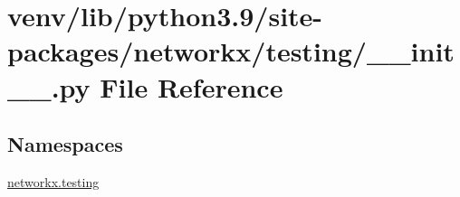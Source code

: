\hypertarget{venv_2lib_2python3_89_2site-packages_2networkx_2testing_2____init_____8py}{}\section{venv/lib/python3.9/site-\/packages/networkx/testing/\+\_\+\+\_\+init\+\_\+\+\_\+.py File Reference}
\label{venv_2lib_2python3_89_2site-packages_2networkx_2testing_2____init_____8py}
\subsection*{Namespaces}
\begin{DoxyCompactItemize}
\item 
 \hyperlink{namespacenetworkx_1_1testing}{networkx.\+testing}
\end{DoxyCompactItemize}
